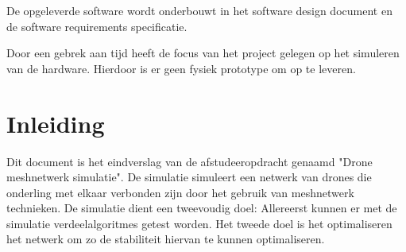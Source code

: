 \documentclass[a4paper, 11pt, oneside]{report}
\begin{document}
De opgeleverde software wordt onderbouwt in het software design document en de software requirements specificatie.

Door een gebrek aan tijd heeft de focus van het project gelegen op het simuleren van de hardware. Hierdoor is er geen fysiek prototype om op te leveren.

\tableofcontents
\clearpage








\chapter{Inleiding}\label{sec:inleiding}

Dit document is het eindverslag van de afstudeeropdracht genaamd "Drone meshnetwerk simulatie".
De simulatie simuleert een netwerk van drones die onderling met elkaar verbonden zijn door het gebruik van meshnetwerk technieken.
De simulatie dient een tweevoudig doel: Allereerst kunnen er met de simulatie verdeelalgoritmes getest worden. Het tweede doel is het optimaliseren het netwerk om zo de stabiliteit hiervan te kunnen optimaliseren.
\end{document}
